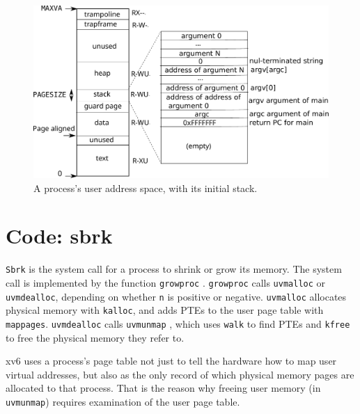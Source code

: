 \begin{figure}[t]
\center
\includegraphics[scale=0.5]{fig/processlayout.pdf}
\caption{A process's user address space, with its initial stack.}
\label{fig:processlayout}
\end{figure}

\section{Code: sbrk}

\lstinline{Sbrk}
is the system call for a process to shrink or grow its memory. The system
call is implemented by the function
\lstinline{growproc}
.
\lstinline{growproc} calls \lstinline{uvmalloc} or
\lstinline{uvmdealloc}, depending on whether \lstinline{n} is positive
or negative.
\lstinline{uvmalloc}
allocates physical memory with {\tt kalloc},
and adds PTEs to the user page table with {\tt mappages}.
\lstinline{uvmdealloc} calls
{\tt uvmunmap}
,
which uses {\tt walk} to find PTEs and
{\tt kfree} to free the physical memory they refer to.

xv6 uses a process's page table not just to tell the hardware how to
map user virtual addresses, but also as the only record of which
physical memory pages are allocated to that process. That is the
reason why freeing user memory (in {\tt uvmunmap}) requires
examination of the user page table.

